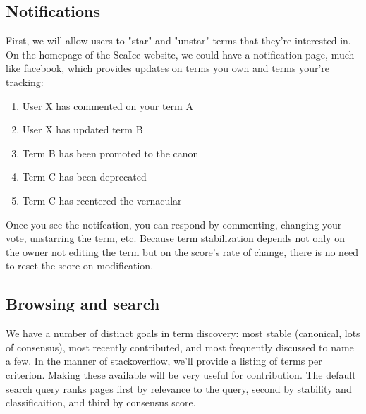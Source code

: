 \documentclass[letter]{article}
\begin{document}
\subsection{Notifications}
First, we will allow users to "star" and "unstar" terms that they're interested in. 
On the homepage of the SeaIce website, we could have a notification page, much like facebook, which 
provides updates on terms you own and terms your're tracking:
\begin{enumerate}
  \item User X has commented on your term A
  \item User X has updated term B 
  \item Term B has been promoted to the canon
  \item Term C has been deprecated
  \item Term C has reentered the vernacular
\end{enumerate}

Once you see the notifcation, you can respond by commenting, changing your vote, unstarring the term,
etc. Because term stabilization depends not only on the owner not editing the term but on the score's
rate of change, there is no need to reset the score on modification. 

\subsection{Browsing and search}
We have a number of distinct goals in term discovery: most stable (canonical, lots of consensus), 
most recently contributed, and most frequently discussed to name a few. In the manner of stackoverflow, 
we'll provide a listing of terms per criterion. Making these available will be very useful for  contribution. 
The default search query ranks pages first by 
relevance to the query, second by stability and classificaition, and third by consensus score. 
\end{document}

